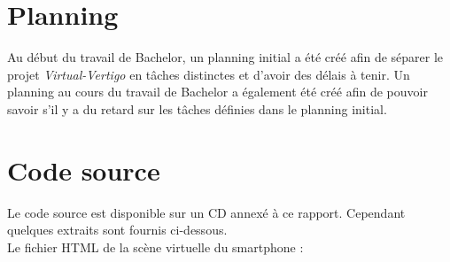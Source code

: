 \chapter{Planning} \label{plannings}
Au début du travail de Bachelor, un planning initial a été créé afin de séparer le projet \textit{Virtual-Vertigo} en tâches distinctes et d'avoir des délais à tenir. Un planning au cours du travail de Bachelor a également été créé afin de pouvoir savoir s'il y a du retard sur les tâches définies dans le planning initial.


\chapter{Code source}
Le code source est disponible sur un CD annexé à ce rapport. Cependant quelques extraits sont fournis ci-dessous. \\
Le fichier HTML de la scène virtuelle du \textsf{smartphone} :
 
